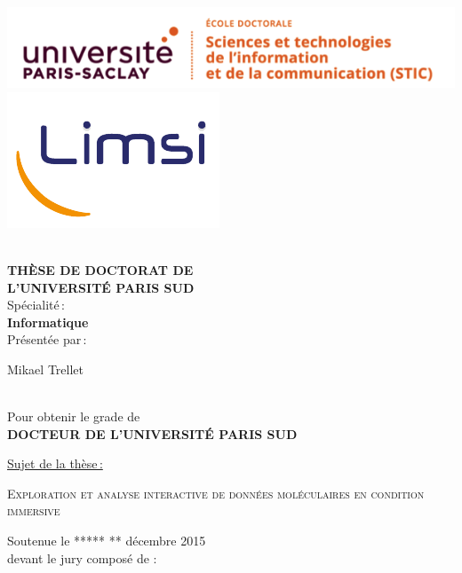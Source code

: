 \begin{titlepage}

\includegraphics[height=2.cm]{./figures/logo_paris_saclay_stic}\hfill
\includegraphics[height=2.cm]{./figures/limsilogo_new_transparent_crop}\hfill
\\
\\



\begin{center}
 \textbf{THÈSE DE DOCTORAT DE\\ L'UNIVERSITÉ PARIS SUD\\}
Spécialité\,:\\
\textbf{Informatique}\\ 
Présentée par\,:\\ 
\begin{LARGE}
Mikael Trellet\end{LARGE}\\
Pour obtenir le grade de\\
\textbf{DOCTEUR DE L'UNIVERSITÉ PARIS SUD}
\end{center}

\noindent \underline{Sujet de la thèse\,:}\\
\begin{center}
\begin{Large}
{\textsc{Exploration et analyse interactive de données moléculaires en condition immersive}}
\end{Large}
\end{center}

Soutenue le ***** ** décembre 2015\\

devant le jury composé de :\\
\begin{center}
	\begin{tabular}{l l l}
	

\end{tabular}
\end{center}
\end{titlepage}
